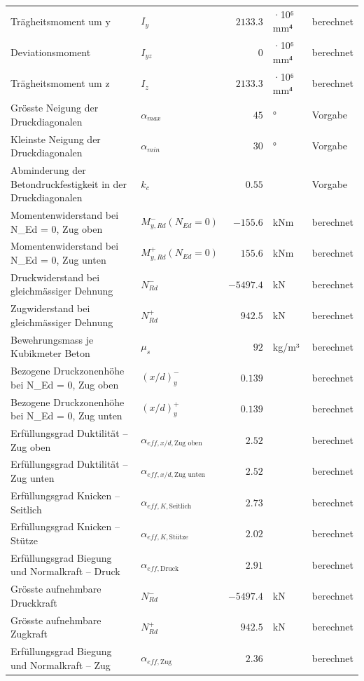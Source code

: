 \documentclass[11pt,a4paper]{article}
\begin{document}
\begin{xltabular}{\linewidth}{>{\raggedright\arraybackslash}Xlrll}
Trägheitsmoment um y & $I_y$ & $2133.3$ & ·10⁶ mm⁴ & berechnet \\
Deviationsmoment & $I_{yz}$ & $0$ & ·10⁶ mm⁴ & berechnet \\
Trägheitsmoment um z & $I_z$ & $2133.3$ & ·10⁶ mm⁴ & berechnet \\
Grösste Neigung der Druckdiagonalen & $\alpha_{max}$ & $45$ & ° & Vorgabe \\
Kleinste Neigung der Druckdiagonalen & $\alpha_{min}$ & $30$ & ° & Vorgabe \\
Abminderung der Betondruckfestigkeit in der Druckdiagonalen & $k_c$ & $0.55$ &  & Vorgabe \\
Momentenwiderstand bei N\_Ed = 0, Zug oben & $M_{y,Rd}^{-}(N_{Ed} = 0)$ & $-155.6$ & kNm & berechnet \\
Momentenwiderstand bei N\_Ed = 0, Zug unten & $M_{y,Rd}^{+}(N_{Ed} = 0)$ & $155.6$ & kNm & berechnet \\
Druckwiderstand bei gleichmässiger Dehnung & $N_{Rd}^{-}$ & $-5497.4$ & kN & berechnet \\
Zugwiderstand bei gleichmässiger Dehnung & $N_{Rd}^{+}$ & $942.5$ & kN & berechnet \\
Bewehrungsmass je Kubikmeter Beton & $\mu_s$ & $92$ & kg/m³ & berechnet \\
Bezogene Druckzonenhöhe bei N\_Ed = 0, Zug oben & $\left(x/d\right)_{y}^{-}$ & $0.139$ &  & berechnet \\
Bezogene Druckzonenhöhe bei N\_Ed = 0, Zug unten & $\left(x/d\right)_{y}^{+}$ & $0.139$ &  & berechnet \\
Erfüllungsgrad Duktilität – Zug oben & $\alpha_{eff,x/d,\text{Zug oben}}$ & $2.52$ &  & berechnet \\
Erfüllungsgrad Duktilität – Zug unten & $\alpha_{eff,x/d,\text{Zug unten}}$ & $2.52$ &  & berechnet \\
Erfüllungsgrad Knicken – Seitlich & $\alpha_{eff,K,\text{Seitlich}}$ & $2.73$ &  & berechnet \\
Erfüllungsgrad Knicken – Stütze & $\alpha_{eff,K,\text{Stütze}}$ & $2.02$ &  & berechnet \\
Erfüllungsgrad Biegung und Normalkraft – Druck & $\alpha_{eff,\text{Druck}}$ & $2.91$ &  & berechnet \\
Grösste aufnehmbare Druckkraft & $N_{Rd}^{-}$ & $-5497.4$ & kN & berechnet \\
Grösste aufnehmbare Zugkraft & $N_{Rd}^{+}$ & $942.5$ & kN & berechnet \\
Erfüllungsgrad Biegung und Normalkraft – Zug & $\alpha_{eff,\text{Zug}}$ & $2.36$ &  & berechnet \\

\end{xltabular}
\end{document}
